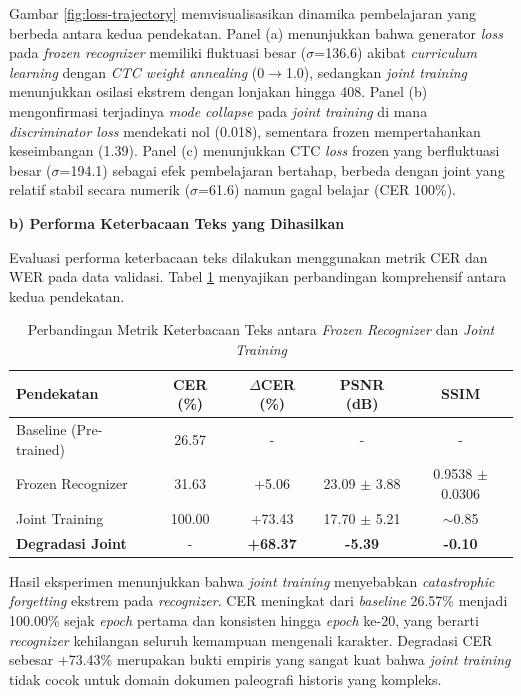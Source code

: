 \documentclass[12pt,a4paper]{article}
\begin{document}
Gambar \ref{fig:loss-trajectory} memvisualisasikan dinamika pembelajaran yang berbeda antara kedua pendekatan. Panel (a) menunjukkan bahwa generator \textit{loss} pada \textit{frozen recognizer} memiliki fluktuasi besar ($\sigma$=136.6) akibat \textit{curriculum learning} dengan \textit{CTC weight annealing} (0$\rightarrow$1.0), sedangkan \textit{joint training} menunjukkan osilasi ekstrem dengan lonjakan hingga 408. Panel (b) mengonfirmasi terjadinya \textit{mode collapse} pada \textit{joint training} di mana \textit{discriminator loss} mendekati nol (0.018), sementara frozen mempertahankan keseimbangan (1.39). Panel (c) menunjukkan CTC \textit{loss} frozen yang berfluktuasi besar ($\sigma$=194.1) sebagai efek pembelajaran bertahap, berbeda dengan joint yang relatif stabil secara numerik ($\sigma$=61.6) namun gagal belajar (CER 100\%).

\vspace{0.5em}

\textbf{b) Performa Keterbacaan Teks yang Dihasilkan}

Evaluasi performa keterbacaan teks dilakukan menggunakan metrik CER dan WER pada data validasi. Tabel \ref{tab:frozen-vs-joint-cer} menyajikan perbandingan komprehensif antara kedua pendekatan.

\begin{table}[H]
\centering
\caption{Perbandingan Metrik Keterbacaan Teks antara \textit{Frozen Recognizer} dan \textit{Joint Training}}
\label{tab:frozen-vs-joint-cer}
\begin{tabular}{lcccc}
\toprule
\textbf{Pendekatan} & \textbf{CER (\%)} & \textbf{$\Delta$CER (\%)} & \textbf{PSNR (dB)} & \textbf{SSIM} \\
\midrule
Baseline (Pre-trained) & 26.57 & - & - & - \\
Frozen Recognizer & 31.63 & +5.06 & 23.09 $\pm$ 3.88 & 0.9538 $\pm$ 0.0306 \\
Joint Training & 100.00 & +73.43 & 17.70 $\pm$ 5.21 & $\sim$0.85 \\
\midrule
\textbf{Degradasi Joint} & - & \textbf{+68.37} & \textbf{-5.39} & \textbf{-0.10} \\
\bottomrule
\end{tabular}
\end{table}

Hasil eksperimen menunjukkan bahwa \textit{joint training} menyebabkan \textit{catastrophic forgetting} ekstrem pada \textit{recognizer}. CER meningkat dari \textit{baseline} 26.57\% menjadi 100.00\% sejak \textit{epoch} pertama dan konsisten hingga \textit{epoch} ke-20, yang berarti \textit{recognizer} kehilangan seluruh kemampuan mengenali karakter. Degradasi CER sebesar +73.43\% merupakan bukti empiris yang sangat kuat bahwa \textit{joint training} tidak cocok untuk domain dokumen paleografi historis yang kompleks.
\end{document}
